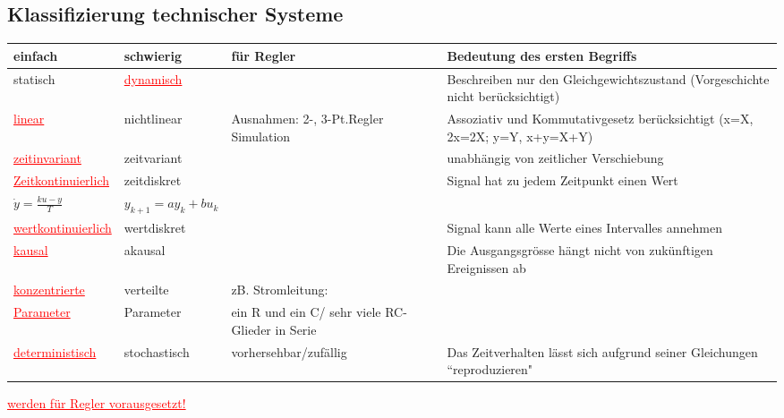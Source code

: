 		
		\subsection{Klassifizierung technischer Systeme}
		\begin{tabular}{|p{3cm}|p{2.5cm}|p{7cm}|p{5.5cm}|}
        	\hline
        	
        	einfach &
        	schwierig &
        	für Regler &
        	Bedeutung des \textbf{ersten} Begriffs\\
        	\hline
        	
        	statisch &
        	\textcolor{red}{\underline{dynamisch}} &
        	&
        	Beschreiben nur den Gleichgewichtszustand (Vorgeschichte nicht
        	berücksichtigt)\\
        	\hline
        	
        	\textcolor{red}{\underline{linear}}	&
        	nichtlinear &
        	Ausnahmen: 2-, 3-Pt.Regler Simulation &
        	Assoziativ und Kommutativgesetz berücksichtigt \newline (x=X, 2x=2X;
        	y=Y, x+y=X+Y)\\
        	\hline
        	
        	\textcolor{red}{\underline{zeitinvariant}} &
        	zeitvariant &
        	&
        	unabhängig von zeitlicher Verschiebung \\
        	\hline
        	
        	\textcolor{red}{\underline{Zeitkontinuierlich}} &
        	zeitdiskret &
        	&
        	Signal hat zu jedem Zeitpunkt einen Wert\\
        	$\dot{y}=\frac{ku-y}{T}$ &
        	$y_{k+1}=a y_k + b u_k$	&
        	&
        	\\
        	\hline
        	
        	\textcolor{red}{\underline{wertkontinuierlich}}&
        	wertdiskret&
        	&
        	Signal kann alle Werte eines Intervalles annehmen\\
        	\hline
        	
        	\textcolor{red}{\underline{kausal}}	&
        	akausal	&
        	&
        	Die Ausgangsgrösse hängt nicht von zukünftigen Ereignissen ab\\
        	\hline
        	
        	\textcolor{red}{\underline{konzentrierte}} &
        	verteilte &
        	zB.	Stromleitung: &
        	\\
        	\textcolor{red}{\underline{Parameter}} &
        	Parameter	&
        	ein R und ein C/ sehr viele RC-Glieder in Serie &
        	\\
        	\hline
        	
        	\textcolor{red}{\underline{deterministisch}}	&
        	stochastisch &
        	vorhersehbar/zufällig &
        	Das Zeitverhalten lässt sich aufgrund seiner Gleichungen
        	``reproduzieren"\\
        	\hline
        \end{tabular}
				\textcolor{red}{\underline{werden für Regler vorausgesetzt!}}
